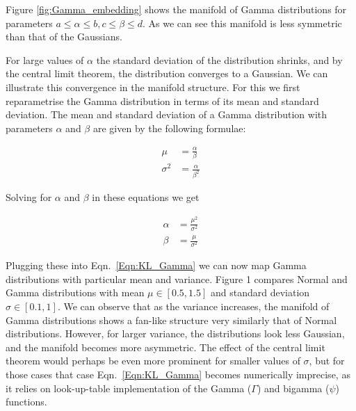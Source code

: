 Figure \ref{fig:Gamma_embedding} shows the manifold of Gamma distributions for parameters $a \leq \alpha \leq b, c\leq \beta \leq d$. As we can see this manifold is less symmetric than that of the Gaussians.

For large values of $\alpha$ the standard deviation of the distribution shrinks, and by the central limit theorem, the distribution converges to a Gaussian. We can illustrate this convergence in the manifold structure. For this we first reparametrise the Gamma distribution in terms of its mean and standard deviation. The mean and standard deviation of a Gamma distribution with parameters $\alpha$ and $\beta$ are given by the following formulae:

\begin{align}
	\mu &= \frac{\alpha}{\beta}\\
	\sigma^2 &= \frac{\alpha}{\beta^2}
\end{align}

Solving for $\alpha$ and $\beta$ in these equations we get

\begin{align}
	\alpha &= \frac{\mu^2}{\sigma^2}\\
	\beta &= \frac{\mu}{\sigma^2}
\end{align}

Plugging these into Eqn.\ \eqref{Eqn:KL_Gamma} we can now map Gamma distributions with particular mean and variance. Figure 1 compares Normal and Gamma distributions with mean $\mu\in[0.5,1.5]$ and standard deviation $\sigma\in[0.1,1]$. We can observe that as the variance increases, the manifold of Gamma distributions shows a fan-like structure very similarly that of Normal distributions. However, for larger variance, the distributions look less Gaussian, and the manifold becomes more asymmetric. The effect of the central limit theorem would perhaps be even more prominent for smaller values of $\sigma$, but for those cases that case Eqn.\ \eqref{Eqn:KL_Gamma} becomes numerically imprecise, as it relies on look-up-table implementation of the Gamma ($\Gamma$) and bigamma ($\psi$) functions.




